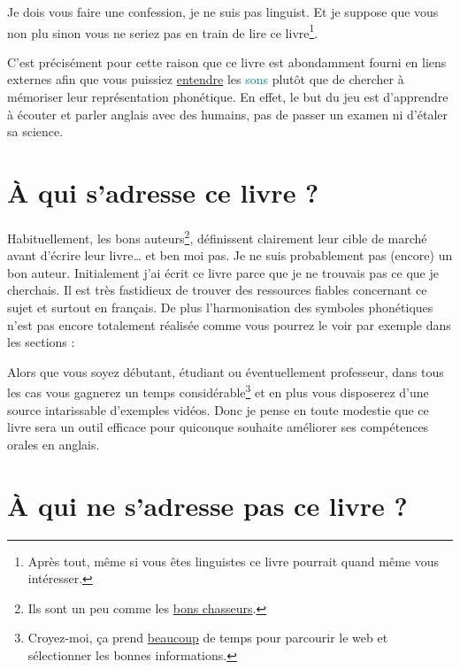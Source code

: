 Je dois vous faire une confession, je ne suis pas \gls{linguist}. Et je
suppose que vous non plu sinon vous ne seriez pas en train de lire ce
livre\footnote{Après tout, même si vous êtes linguistes ce livre
  pourrait quand même vous intéresser.}.

C'est précisément pour cette raison que ce livre est abondamment
fourni en liens externes afin que vous puissiez \underline{entendre}
les \textcolor{teal}{sons} plutôt que de chercher à mémoriser leur
représentation phonétique. En effet, le but du jeu est d'apprendre à
écouter et parler anglais avec des humains, pas de passer un examen ni
d'étaler sa science.

\newpage

\section{À qui s'adresse ce livre ?}\label{sec:for-who}

Habituellement, les bons auteurs\footnote{Ils sont un peu comme les
  \href{https://www.amazon.fr/gp/product/B0103QW256/ref=as_li_tl?ie=UTF8\&camp=1642\&creative=6746\&creativeASIN=B0103QW256\&linkCode=as2\&tag=wwwbecomefree-21\&linkId=0a96fb10b5f781c84d66ef5b92ea65b6}{bons
    chasseurs}.}, définissent clairement leur cible de marché avant
d'écrire leur livre\dots\xspace et ben moi pas. Je ne suis probablement pas
(encore) un bon auteur. Initialement j'ai écrit ce livre parce que je
ne trouvais pas ce que je cherchais. Il est très fastidieux de trouver
des ressources fiables concernant ce sujet et surtout en français. De
plus l'\hypertarget{notation}{harmonisation} des symboles phonétiques n'est pas encore
totalement réalisée comme vous pourrez le voir par exemple dans les
sections :



  

Alors que vous soyez débutant, étudiant ou éventuellement professeur,
dans tous les cas vous gagnerez un temps
considérable\footnote{Croyez-moi, ça prend \underline{beaucoup} de
temps pour parcourir le web et sélectionner les bonnes informations.}
et en plus vous disposerez d'une source intarissable d'exemples
vidéos. Donc je pense en toute modestie que ce livre sera un outil
efficace pour quiconque souhaite améliorer ses compétences orales en anglais.

\newpage

\section{À qui ne s'adresse pas ce livre ?}\label{sec:for-not-who}

